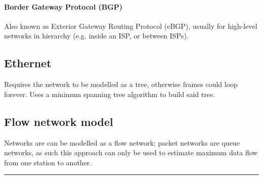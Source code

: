 \documentclass{form}
\begin{document}
\begin{multicols}{3}
    \paragraph{Border Gateway Protocol (BGP)}
    Also known as Exterior Gateway Routing Protocol (eBGP), usually for high-level networks in hierarchy (e.g. inside an ISP, or between ISPs).

    \subsection*{Ethernet}
    Requires the network to be modelled as a tree, otherwise frames could loop forever. Uses a minimum spanning tree algorithm to build said tree.

    \subsection*{Flow network model}
    Networks are can be modelled as a flow network; packet networks are queue networks, as such this approach can only be used to estimate maximum data flow from one station to another.

\end{multicols}

\vspace{-1.5em}\rule{\textwidth}{1.0pt}\vspace{-0.5em}
\end{document}
